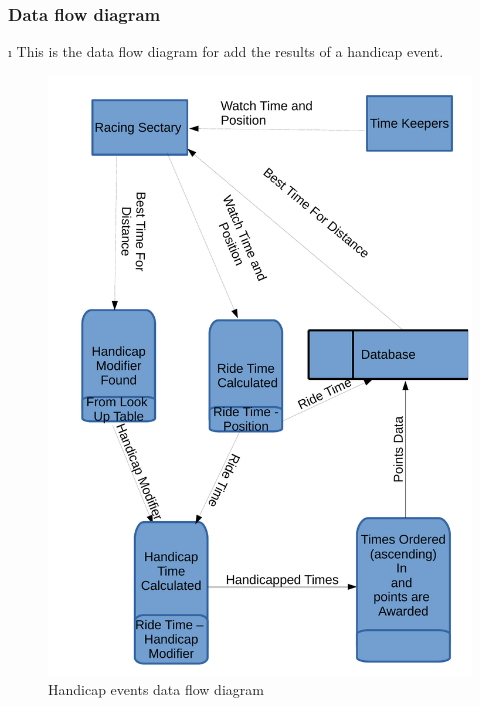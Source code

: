 \subsubsection{Data flow diagram}\i
This is the data flow diagram for add the results of a handicap event.
\begin{figure}[H]
    \includegraphics[width=\textwidth]{./HandicapDFD.pdf}
    \caption{Handicap events data flow diagram} \label{fig:Handicap_even_DFD}
\end{figure}

